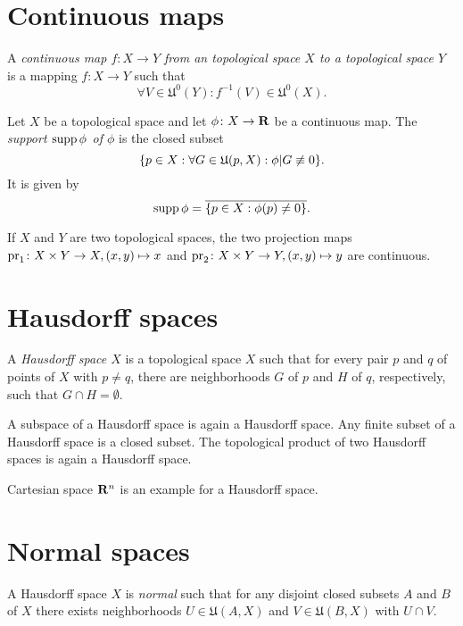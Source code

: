 \section{Continuous maps}
\label{sec:continuity}

\begin{dfn}
  A \emph{continuous map $f\colon X \to Y$ from an topological space $X$ to
  a topological space $Y$} is a mapping $f\colon X \to Y$ such that
  \[
    \forall V \in \mathfrak U^0(Y) : f^{-1}(V) \in \mathfrak U^0(X).
  \]
\end{dfn}

Let $X$ be a topological space and let $\phi\colon X \to \mathbf{R}$ be a continuous map.
The \emph{support $\operatorname{supp} \phi$ of $\phi$} is the closed subset
\[
  \lbrace p \in X : \forall G \in \mathfrak U(p, X): \phi|G \not\equiv 0\rbrace.
\]
It is given by
\begin{equation}
  \label{eq:support}
  \operatorname{supp} \phi = \overline{\lbrace p \in X : \phi(p) \neq 0\rbrace}.
\end{equation}

If $X$ and $Y$ are two topological spaces, the two projection maps
$\mathrm{pr}_1\colon X \times Y \to X, (x, y) \mapsto x$ and
$\mathrm{pr}_2\colon X \times Y \to Y, (x, y) \mapsto y$ are continuous.

\section{Hausdorff spaces}
\label{sec:hausdorff_spaces}

\begin{dfn}
  A \emph{Hausdorff space $X$} is a topological space $X$ such that for every
  pair $p$ and $q$ of points of $X$ with $p \neq q$, there are neighborhoods $G$
  of $p$ and $H$ of $q$, respectively, such that $G \cap H = \emptyset$.
\end{dfn}
A subspace of a Hausdorff space is again a Hausdorff space. Any finite subset of
a Hausdorff space is a closed subset. The topological product of two Hausdorff
spaces is again a Hausdorff space.

Cartesian space $\mathbf{R}^n$ is an example for a Hausdorff space.

\section{Normal spaces}

\begin{dfn}
  A Hausdorff space $X$ is \emph{normal} such that for any disjoint closed
  subsets $A$ and $B$ of $X$ there exists neighborhoods $U \in \mathfrak U(A, X)$
  and $V \in \mathfrak U(B, X)$ with $U \cap V$.
\end{dfn}

